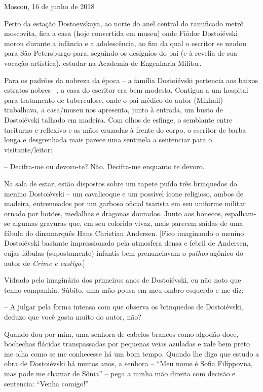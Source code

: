 \begin{flushright}
Moscou, 16 de junho de 2018
\end{flushright}

Perto da estação Dostoevskaya, ao norte do anel central do ramificado
metrô moscovita, fica a casa (hoje convertida em museu) onde Fiódor
Dostoiévski morou durante a infância e a adolescência, ao fim da qual o
escritor se mudou para São Petersburgo para, seguindo os desígnios do
pai (e à revelia de sua vocação artística), estudar na Academia de
Engenharia Militar.

Para os padrões da nobreza da época -- a família Dostoiévski pertencia
aos baixos estratos nobres --, a casa do escritor era bem modesta.
Contígua a um hospital para tratamento de tuberculose, onde o pai médico
do autor (Mikhail) trabalhava, a casa/museu nos apresenta, junto à
entrada, um busto de Dostoiévski talhado em madeira. Com olhos de
esfinge, o semblante entre taciturno e reflexivo e as mãos cruzadas à
frente do corpo, o escritor de barba longa e desgrenhada mais parece uma
sentinela a sentenciar para o visitante/leitor:

-- Decifra-me ou devoro-te? Não. Decifra-me enquanto te devoro.

Na sala de estar, estão dispostos sobre um tapete puído três brinquedos
do menino Dostoiévski -- um cavalicoque e um possível ícone religioso,
ambos de madeira, entremeados por um garboso oficial tsarista em seu
uniforme militar ornado por botões, medalhas e dragonas dourados. Junto
aos bonecos, espalham-se algumas gravuras que, em seu colorido vivaz,
mais parecem saídas de uma fábula do dinamarquês Hans Christian
Andersen. {[}Fico imaginando o menino Dostoiévski bastante impressionado
pela atmosfera densa e febril de Andersen, cujas fábulas (supostamente)
infantis bem prenunciavam o \emph{pathos} agônico do autor de
\emph{Crime e castigo}.{]}

Vidrado pelo imaginário dos primeiros anos de Dostoiévski, eu não noto
que tenho companhia. Súbito, uma mão pousa em meu ombro esquerdo e me
diz:

-- A julgar pela forma intensa com que observa os brinquedos de
Dostoiévski, deduzo que você gosta muito do autor, não?

Quando dou por mim, uma senhora de cabelos brancos como algodão doce,
bochechas flácidas transpassadas por pequenas veias azuladas e xale bem
preto me olha como se me conhecesse há um bom tempo. Quando lhe digo que
estudo a obra de Dostoiévski há muitos anos, a senhora -- ``Meu nome é
Sofia Filíppovna, mas pode me chamar de Sônia'' -- pega a minha mão
direita com decisão e sentencia: ``Venha comigo!''

